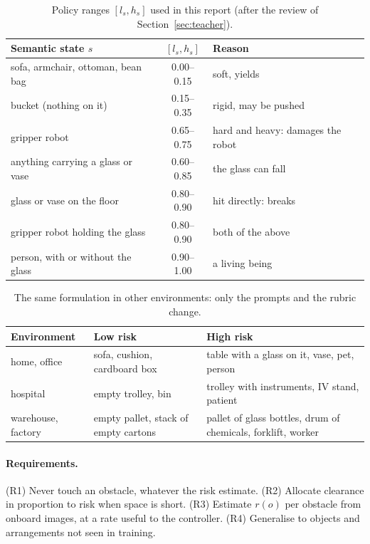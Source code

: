 \documentclass[10pt,a4paper]{article}
\begin{document}
\begin{table}[htbp]
\centering\small
\caption{Policy ranges $[l_s,h_s]$ used in this report (after the review of Section~\ref{sec:teacher}).}
\label{tab:policy}
\begin{tabular}{lcl}
\toprule
Semantic state $s$ & $[l_s,h_s]$ & Reason \\
\midrule
sofa, armchair, ottoman, bean bag & 0.00--0.15 & soft, yields \\
bucket (nothing on it) & 0.15--0.35 & rigid, may be pushed \\
gripper robot & 0.65--0.75 & hard and heavy: damages the robot \\
anything carrying a glass or vase & 0.60--0.85 & the glass can fall \\
glass or vase on the floor & 0.80--0.90 & hit directly: breaks \\
gripper robot holding the glass & 0.80--0.90 & both of the above \\
person, with or without the glass & 0.90--1.00 & a living being \\
\bottomrule
\end{tabular}
\end{table}

\begin{table}[htbp]
\centering\small
\caption{The same formulation in other environments: only the prompts and the rubric change.}
\label{tab:domains}
\begin{tabularx}{0.92\textwidth}{l>{\raggedright}X>{\raggedright\arraybackslash}X}
\toprule
Environment & Low risk & High risk \\
\midrule
home, office & sofa, cushion, cardboard box & table with a glass on it, vase, pet, person \\
hospital & empty trolley, bin & trolley with instruments, IV stand, patient \\
warehouse, factory & empty pallet, stack of empty cartons & pallet of glass bottles, drum of chemicals, forklift, worker \\
\bottomrule
\end{tabularx}
\end{table}

\paragraph{Requirements.} (R1) Never touch an obstacle, whatever the risk estimate. (R2) Allocate clearance in proportion to risk
when space is short. (R3) Estimate $r(o)$ per obstacle from onboard images, at a rate useful to the controller. (R4) Generalise to
objects and arrangements not seen in training.
\end{document}
